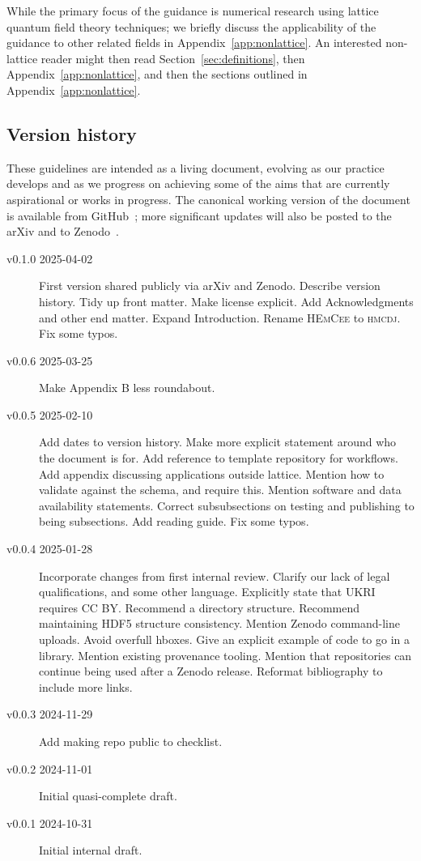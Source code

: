 \documentclass{article}
\newcommand\program[1]{\textsc{#1}\xspace}
\begin{document}
While the primary focus of the guidance is
numerical research using lattice quantum field theory techniques;
we briefly discuss the applicability of the guidance to other related fields
in Appendix~\ref{app:nonlattice}.
An interested non-lattice reader might then read Section~\ref{sec:definitions},
then Appendix~\ref{app:nonlattice},
and then the sections outlined in Appendix~\ref{app:nonlattice}.

\subsection{Version history}

These guidelines are intended as a living document,
evolving as our practice develops
and as we progress on achieving
some of the aims that are currently aspirational or works in progress.
The canonical working version of the document
is available from GitHub~\cite{this-github};
more significant updates
will also be posted to the arXiv and to Zenodo~\cite{this-zenodo}.

\begin{description}
  \item[v0.1.0 2025-04-02]
        First version shared publicly via arXiv and Zenodo.
        Describe version history.
        Tidy up front matter.
        Make license explicit.
        Add Acknowledgments and other end matter.
        Expand Introduction.
        Rename \program{HEmCee} to \program{hmcdj}.
        Fix some typos.
  \item[v0.0.6 2025-03-25]
        Make Appendix B less roundabout.
  \item[v0.0.5 2025-02-10]
        Add dates to version history.
        Make more explicit statement around who the document is for.
        Add reference to template repository for workflows.
        Add appendix discussing applications outside lattice.
        Mention how to validate against the schema,
        and require this.
        Mention software and data availability statements.
        Correct subsubsections on testing and publishing to being subsections.
        Add reading guide.
        Fix some typos.
  \item[v0.0.4 2025-01-28]
        Incorporate changes from first internal review.
        Clarify our lack of legal qualifications,
        and some other language.
        Explicitly state that UKRI requires CC BY\@.
        Recommend a directory structure.
        Recommend maintaining HDF5 structure consistency.
        Mention Zenodo command-line uploads.
        Avoid overfull hboxes.
        Give an explicit example of code to go in a library.
        Mention existing provenance tooling.
        Mention that repositories can continue being used after a Zenodo release.
        Reformat bibliography to include more links.
  \item[v0.0.3 2024-11-29]
        Add making repo public to checklist.
  \item[v0.0.2 2024-11-01]
        Initial quasi-complete draft.
  \item[v0.0.1 2024-10-31]
        Initial internal draft.
\end{description}
\end{document}
